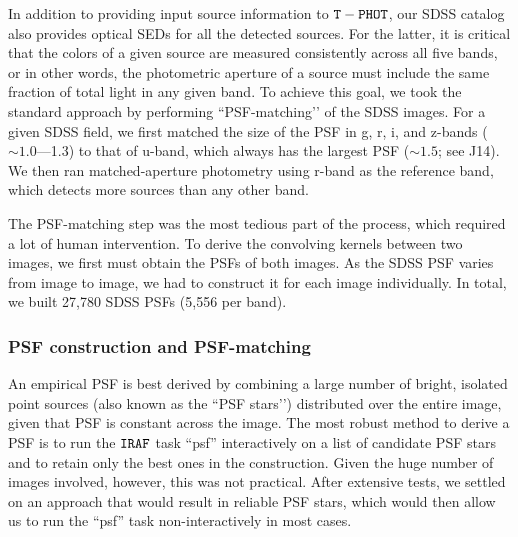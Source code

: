 \documentclass[apj,iop]{emulateapj}
\begin{document}
In addition to providing input source information to $\tt T-PHOT$, our SDSS catalog also provides optical SEDs for all the detected sources. For the latter, it is critical that the colors of a given source are measured consistently across all five bands, or in other words, the photometric aperture of a source must include the same fraction of total light in any given band. To achieve this goal, we took the standard approach by performing ``PSF-matching’’ of the SDSS images. For a given SDSS field, we first matched the size of the PSF in g, r, i, and z-bands ($\sim 1.0$—1.3\arcsec) to that of u-band, which always has the largest PSF ($\sim 1.5$\arcsec; see J14). We then ran matched-aperture photometry using r-band as the reference band, which detects more sources than any other band.

The PSF-matching step was the most tedious part of the process, which required a lot of human intervention. To derive the convolving kernels between two images, we first must obtain the PSFs of both images. As the SDSS PSF varies from image to image, we had to construct it for each image individually. In total, we built 27,780 SDSS PSFs (5,556 per band).

\subsubsection{PSF construction and PSF-matching}
An empirical PSF is best derived by combining a large number of bright, isolated point sources (also known as the ``PSF stars’’) distributed over the entire image, given that PSF is constant across the image. The most robust method to derive a PSF is to run the $\tt IRAF$ task “psf” interactively on a list of candidate PSF stars and to retain only the best ones in the construction. Given the huge number of images involved, however, this was not practical. After  extensive tests, we settled on an approach that would result in reliable PSF stars, which would then allow us to run the “psf” task non-interactively in most cases.
\end{document}
